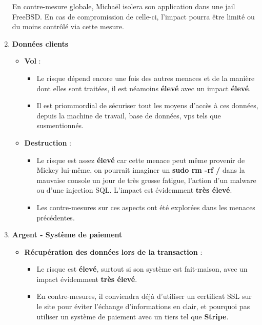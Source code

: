 \documentclass[a4paper,10pt,final,fleqn]{article}
\begin{document}
\begin{enumerate}
						En contre-mesure globale, Michaël isolera son application dans une jail FreeBSD. En cas de compromission de celle-ci, l'impact pourra être limité ou du moins contrôlé via cette mesure. \\
						
					\item \textbf{Données clients}

						\begin{itemize}
							\item \textbf{Vol} : \\

								\begin{itemize}
									\item Le risque dépend encore une fois des autres menaces et de la manière dont elles sont traitées, il est néamoins \textbf{élevé} avec un impact \textbf{élevé}.
									\item Il est priommordial de sécuriser tout les moyens d'accès à ces données, depuis la machine de travail, base de données, vps tels que susmentionnés.\\
								\end{itemize}
							 
							\item \textbf{Destruction} : \\

								\begin{itemize}
									\item Le risque est assez \textbf{élevé} car cette menace peut même provenir de Mickey lui-même, on pourrait imaginer un \textbf{sudo rm -rf /} dans la mauvaise console un jour de très grosse fatigue, l'action d'un malware ou d'une injection SQL. L'impact est évidemment \textbf{très élevé}.\\
									\item Les contre-mesures sur ces aspects ont été explorées dans les menaces précédentes.\\
								\end{itemize}
							
						\end{itemize}
						
					\item \textbf{Argent - Système de paiement}

						\begin{itemize}
							\item \textbf{Récupération des données lors de la transaction} : 
							\begin{itemize}
								\item Le risque est \textbf{élevé}, surtout si son système est fait-maison, avec un impact évidemment \textbf{très élevé}.\\
								\item En contre-mesures, il conviendra déjà d'utiliser un certificat SSL sur le site pour éviter l'échange d'informations en clair, et pourquoi pas utiliser un système de paiement avec un tiers tel que \textbf{Stripe}.\\
							\end{itemize}
							

\end{itemize}
\end{enumerate}
\end{document}
